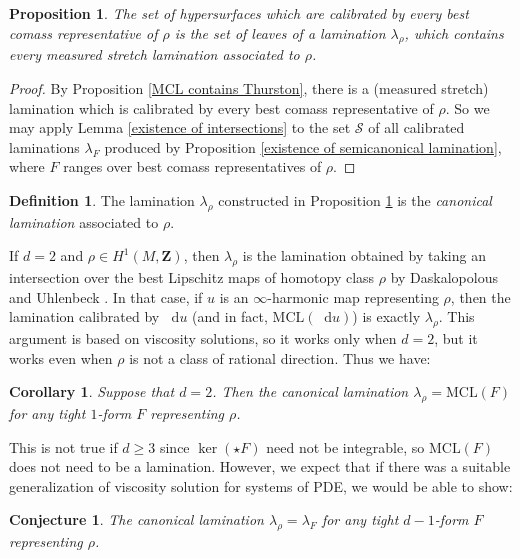 \documentclass[reqno,11pt]{amsart}
\newcommand{\ZZ}{\mathbf{Z}}
\newcommand*\dif{\mathop{}\!\mathrm{d}}
\newcommand{\MCL}{\mathrm{MCL}}
\newcommand{\dfn}[1]{\emph{#1}\index{#1}}
\newtheorem{proposition}[theorem]{Proposition}
\newtheorem{corollary}[theorem]{Corollary}
\newtheorem{conjecture}[theorem]{Conjecture}
\theoremstyle{definition}
\newtheorem{definition}[theorem]{Definition}
\numberwithin{equation}{section}
\begin{document}
\begin{proposition}\label{existence of canonical lamination}
The set of hypersurfaces which are calibrated by every best comass representative of $\rho$ is the set of leaves of a lamination $\lambda_\rho$, which contains every measured stretch lamination associated to $\rho$.
\end{proposition}
\begin{proof}
By Proposition \ref{MCL contains Thurston}, there is a (measured stretch) lamination which is calibrated by every best comass representative of $\rho$.
So we may apply Lemma \ref{existence of intersections} to the set $\mathscr S$ of all calibrated laminations $\lambda_F$ produced by Proposition \ref{existence of semicanonical lamination}, where $F$ ranges over best comass representatives of $\rho$.
\end{proof}

\begin{definition}
The lamination $\lambda_\rho$ constructed in Proposition \ref{existence of canonical lamination} is the \dfn{canonical lamination} associated to $\rho$.
\end{definition}

If $d = 2$ and $\rho \in H^1(M, \ZZ)$, then $\lambda_\rho$ is the lamination obtained by taking an intersection over the best Lipschitz maps of homotopy class $\rho$ by Daskalopolous and Uhlenbeck \cite[\S6.2]{daskalopoulos2020transverse}.
In that case, if $u$ is an $\infty$-harmonic map representing $\rho$, then the lamination calibrated by $\dif u$ (and in fact, $\MCL(\dif u)$) is exactly $\lambda_\rho$.
This argument is based on viscosity solutions, so it works only when $d = 2$, but it works even when $\rho$ is not a class of rational direction.
Thus we have:

\begin{corollary}
Suppose that $d = 2$.
Then the canonical lamination $\lambda_\rho = \MCL(F)$ for any tight $1$-form $F$ representing $\rho$.
\end{corollary}

This is not true if $d \geq 3$ since $\ker(\star F)$ need not be integrable, so $\MCL(F)$ does not need to be a lamination.
However, we expect that if there was a suitable generalization of viscosity solution for systems of PDE, we would be able to show:

\begin{conjecture}
The canonical lamination $\lambda_\rho = \lambda_F$ for any tight $d - 1$-form $F$ representing $\rho$.
\end{conjecture}
\end{document}
